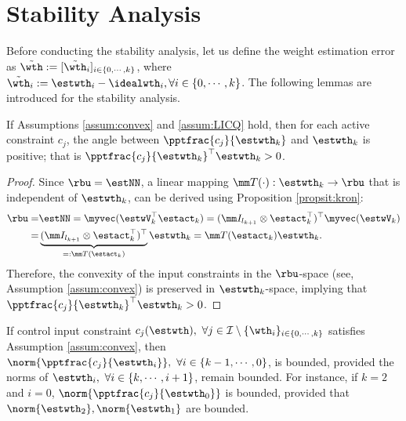 \documentclass[journal]{IEEEtran}
\begin{document}
\section{Stability Analysis}\label{sec:stability}

Before conducting the stability analysis, let us define the weight estimation error as $\tilde\wth:= [\tilde\wth_i]_{i\in\{0,\cdots,k\}}$, where $\tilde\wth_i:=\estwth_i-\idealwth_i, \forall i\in\{0,\cdots,k\}$.
The following lemmas are introduced for the stability analysis. 

\begin{lem}
    If Assumptions \ref{assum:convex} and \ref{assum:LICQ} hold, then for each active constraint $c_j$, the angle between $\pptfrac{c_j}{\estwth_k}$ and $\estwth_k$ is positive; that is $\pptfrac{c_j}{\estwth_k}^\top\estwth_k>0$.
    \label{lem:convex:angle}
\end{lem}

\begin{proof}

Since $\rbu = \estNN$, a linear mapping $\mm T(\cdot):\estwth_k\to\rbu$ that is independent of $\estwth_k$, can be derived using Proposition \ref{propsit:kron}:
\begin{equation}\label{eq:linear:map}
    \begin{aligned}
    \rbu 
    = 
    &
    \estNN 
    =
    \myvec(
        \estwV_k^\top \estact_k
    ) 
    = 
    (
        \mm I_{l_{k+1}}
        \otimes 
        \estact_k^\top
    )^\top
    \myvec(\estwV_k)
    \\
    = &
    \underbrace{
        (
        \mm I_{l_{k+1}}
        \otimes 
        \estact_k^\top
    )^\top}_{=:\mm T(\estact_k)}
    \estwth_k 
    =
    \mm T(\estact_k) \estwth_k.
    \end{aligned}
\end{equation}
Therefore, the convexity of the input constraints in the $\rbu$-space (see, Assumption \ref{assum:convex}) is preserved in $\estwth_k$-space, implying
that $\pptfrac{c_j}{\estwth_k}^\top\estwth_k>0$.

\end{proof}

\begin{lem} 
    If control input constraint $c_j(\estwth),\ \forall j\in\mathcal I \setminus \{\wth_i\}_{i\in\{0,\cdots,k\}}$ satisfies Assumption \ref{assum:convex}, then $\norm{\pptfrac{c_j}{\estwth_i}},\ \forall i\in\{k-1,\cdots, 0\}$, is bounded, provided the norms of $\estwth_i,\ \forall i\in\{k,\cdots, i+1\}$, remain bounded.
    For instance, if $k=2$ and $i=0$, $\norm{\pptfrac{c_j}{\estwth_0}}$ is bounded, provided that $\norm{\estwth_2},\norm{\estwth_1}$ are bounded.
    \label{lem:cstr:grad:bound}
\end{lem}
\end{document}
